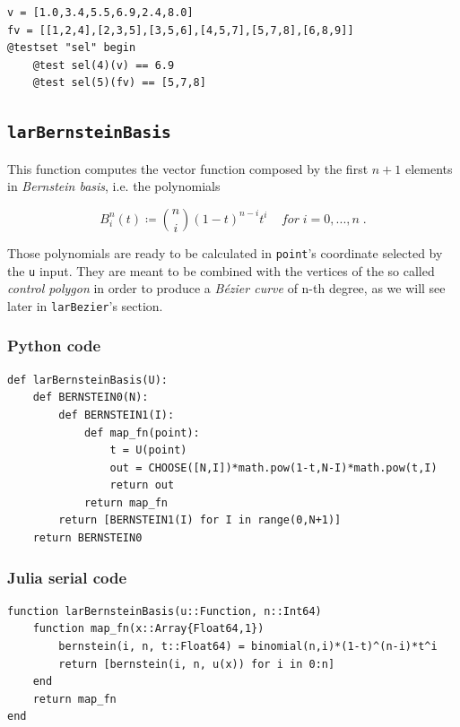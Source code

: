 \documentclass[a4paper,11pt]{article}
\begin{document}
\begin{verbatim}
v = [1.0,3.4,5.5,6.9,2.4,8.0]
fv = [[1,2,4],[2,3,5],[3,5,6],[4,5,7],[5,7,8],[6,8,9]]
@testset "sel" begin
    @test sel(4)(v) == 6.9
    @test sel(5)(fv) == [5,7,8]
\end{verbatim}


\subsection{\texttt{larBernsteinBasis}}

This function computes the vector function composed by the first $n+1$ elements in \emph{Bernstein basis}, i.e. the polynomials

\begin{equation}
\label{eqn: bernstein}
B_i^n(t)\coloneqq\binom{n}{i}(1-t)^{n-i}t^i \;\;\;\; for \; i=0,...,n\;.
\end{equation}

Those polynomials are ready to be calculated in \texttt{point}'s coordinate selected by the \texttt{u} input. They are meant to be combined with the vertices of the so called \emph{control polygon} in order to produce a \emph{B\'ezier curve} of n-th degree, as we will see later in \texttt{larBezier}'s section. \\


\subsubsection{Python code}
\begin{verbatim}
def larBernsteinBasis(U):
    def BERNSTEIN0(N):
        def BERNSTEIN1(I):
            def map_fn(point):
                t = U(point)
                out = CHOOSE([N,I])*math.pow(1-t,N-I)*math.pow(t,I)
                return out
            return map_fn
        return [BERNSTEIN1(I) for I in range(0,N+1)]
    return BERNSTEIN0
\end{verbatim}

\subsubsection{Julia serial code}

\begin{verbatim}
function larBernsteinBasis(u::Function, n::Int64)
    function map_fn(x::Array{Float64,1})
        bernstein(i, n, t::Float64) = binomial(n,i)*(1-t)^(n-i)*t^i
        return [bernstein(i, n, u(x)) for i in 0:n]
    end
    return map_fn
end
\end{verbatim}
\end{document}
